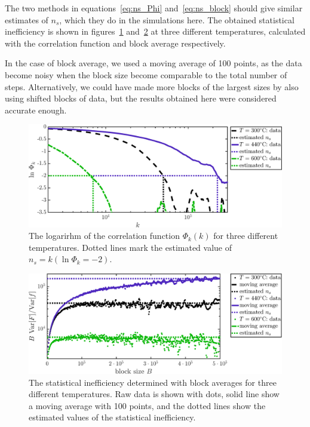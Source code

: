 The two methods in equations~\eqref{eq:ns_Phi} and~\eqref{eq:ns_block} should give similar estimates of $n_s$, which they do in the simulations here. The obtained statistical inefficiency is shown in figures~\ref{fig:ns_phi} and~\ref{fig:ns_block}   at three different temperatures, calculated with the correlation function and block average respectively. 

In the case of block average, we used a moving average of 100 points, as the data become noisy when the block size become comparable to the total number of steps. Alternatively, we could have made more blocks of the largest sizes by also using shifted blocks of data, but the results obtained here were considered accurate enough. 

\begin{figure}[!ht]
\begin{center}
  \includegraphics[width=\textwidth]{../figures/stat_inefficiency_Phi} 
  \caption{The logarirhm of the correlation function $\Phi_k(k)$ for three different temperatures. Dotted lines mark the estimated value of $n_s = k (\ln \Phi_k = -2)$.}
  \label{fig:ns_phi}
\end{center}
\end{figure}

\begin{figure}[!ht]
\begin{center}
  \includegraphics[width=\textwidth]{../figures/stat_inefficiency_block} 
  \caption{The statistical inefficiency determined with block averages for three different temperatures. Raw data is shown with dots, solid line show a moving average with 100 points, and the dotted lines show the estimated values of the statistical inefficiency.}
  \label{fig:ns_block}
\end{center}
\end{figure}

